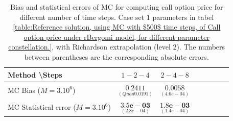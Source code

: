 %
%		
%		




\begin{table}[h!]
	\centering
	\begin{tabular}{l*{6}{c}r}
		Method \textbackslash  Steps            & $1-2-4$ & $2-4-8$  \\
		\hline
		MC  Bias  ($M=3.10^6$)   &$\underset{( Quad 0.0191)}{\mathbf{  0.2411}}$  & $\underset{(      4.6e-04)}{\mathbf{  0.0058}}$   \\	
		
		MC Statistical error ($M=3.10^6$)   & $\underset{( 2.8e-04)}{\mathbf{3.5e-03}}$  & $\underset{(   1.4e-04)}{\mathbf{    1.8e-03}}$  \\	
		
		
		
		\hline
	\end{tabular}
	\caption{Bias and statistical errors of MC   for computing call option price  for different number of time steps. Case set $1$ parameters in tabel \ref{table:Reference solution, using MC with $500$ time steps, of Call option price under rBergomi model, for different parameter constellation.}, with Richardson extrapolation (level $2$). The numbers between parentheses are the corresponding absolute errors.}
	\label{Bias and Statistical errors of MC ($M=3.10^6$)  for computing Call option price  for different number of time steps. Case set $2$ parameters, with Richardson extrapolation (level2). The numbers between parentheses are the corresponding absolute errors.}
\end{table}





